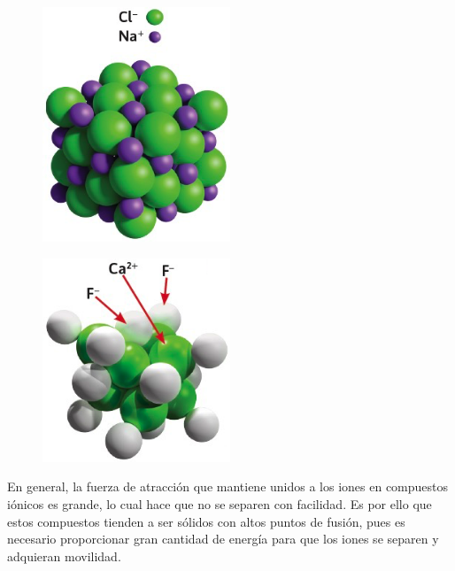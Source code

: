 \documentclass[11pt]{book}
\begin{document}
\begin{minipage}{0.45\textwidth}
  \begin{figure}[H]
    \centering
    \includegraphics[width=0.5\textwidth]{ionicos1.jpg}
    \label{fig:ionicos1}
  \end{figure}
\end{minipage}\hfill
\begin{minipage}{0.45\textwidth}
  \begin{figure}[H]
    \centering
    \includegraphics[width=0.5\textwidth]{ionicos2.jpg}
    \label{fig:ionicos2}
  \end{figure}
\end{minipage}


En general, la fuerza de atracción que mantiene unidos a los iones en compuestos iónicos es grande,
lo cual hace que no se separen con facilidad. Es por ello que estos compuestos tienden a ser sólidos
con altos puntos de fusión, pues es necesario proporcionar gran cantidad de energía para que los
iones se separen y adquieran movilidad.
\end{document}
